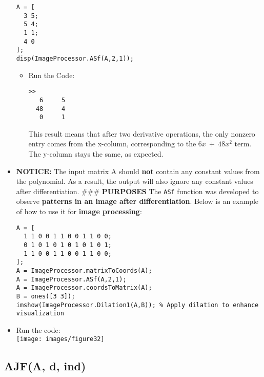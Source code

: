 \documentclass[11pt]{amsart}
\theoremstyle{remark}
\theoremstyle{definition}
\theoremstyle{remark}
\numberwithin{equation}{section}
\begin{document}
\begin{itemize}
\begin{verbatim}
A = [
  3 5;
  5 4;
  1 1;
  4 0
];
disp(ImageProcessor.ASf(A,2,1));
\end{verbatim}

  \begin{itemize}
  \item
    Run the Code:

\begin{verbatim}
>> 
   6     5
  48     4
   0     1
\end{verbatim}

    This result means that after two derivative operations, the only
    nonzero entry comes from the x-column, corresponding to the
    \texttt{$6x\ +\ 48x^2$} term. The y-column stays the same, as expected.
  \end{itemize}
\item
  \textbf{NOTICE:} The input matrix A should \textbf{not} contain any
  constant values from the polynomial. As a result, the output will also
  ignore any constant values after differentiation. \#\#\#
  \textbf{PURPOSES} The \texttt{ASf} function was developed to observe
  \textbf{patterns in an image after differentiation}. Below is an
  example of how to use it for \textbf{image processing}:

\begin{verbatim}
A = [
  1 1 0 0 1 1 0 0 1 1 0 0;
  0 1 0 1 0 1 0 1 0 1 0 1;
  1 1 0 0 1 1 0 0 1 1 0 0;
];
A = ImageProcessor.matrixToCoords(A);
A = ImageProcessor.ASf(A,2,1);
A = ImageProcessor.coordsToMatrix(A);
B = ones([3 3]);
imshow(ImageProcessor.Dilation1(A,B)); % Apply dilation to enhance visualization
\end{verbatim}
\item
  Run the code:\\
  \texttt{[image: images/figure32]}
\end{itemize}

\subsection{AJF(A, d, ind)}\label{ajfa-d-ind}
\end{document}
